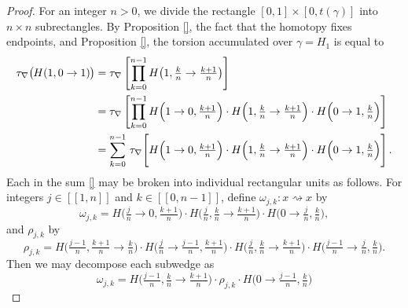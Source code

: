 \begin{proof}
  For an integer $n > 0$, we divide the rectangle $[0, 1] \times [0, t(\gamma)]$ into $n \times n$ subrectangles. By Proposition \ref{}, the fact that the homotopy fixes endpoints, and Proposition \ref{}, the torsion accumulated over $\gamma = H_1$ is equal to 
  \begin{align}
  \tau_\nabla \big(\hspace{-0.5pt}H(1, 0 \to 1)\hspace{-0.5pt}\big) 
  &= \tau_\nabla \left[\prod_{k = 0}^{n-1} H\big(1, \tfrac{k}{n} \to \tfrac{k + 1}{n}\big)\right] \\
  &= \tau_\nabla \left[\prod_{k = 0}^{n-1} H\Big(1 \to 0, \tfrac{k+1}{n}\Big) \cdot  H\Big(1, \tfrac{k}{n} \to \tfrac{k + 1}{n}\Big) \cdot H\Big(0 \to 1, \tfrac{k}{n}\Big)\right] \\
  &= \sum_{k=0}^{n- 1} \,\tau_\nabla \! \left[\vphantom{\prod^{n-1}}H\Big(1 \to 0, \tfrac{k+1}{n}\Big) \cdot  H\Big(1, \tfrac{k}{n} \to \tfrac{k + 1}{n}\Big) \cdot H\Big(0 \to 1, \tfrac{k}{n}\Big)\right].
  \end{align}
  Each  in the sum \ref{} may be broken into individual rectangular units as follows. For integers $j \in [\![1, n]\!]$ and $k \in [\![0, n - 1]\!]$, define  $ \omega_{j, k} \colon x \rightsquigarrow x$ by
  \begin{equation}
   \omega_{j, k} = H\Big(\tfrac{j}{n} \to 0, \tfrac{k+1}{n}\Big) \cdot  H\Big(\tfrac{j}{n}, \tfrac{k}{n} \to \tfrac{k + 1}{n}\Big) \cdot H\Big(0 \to \tfrac{j}{n}, \tfrac{k}{n}\Big),
  \end{equation}
  and  $\rho_{j,k}$ by 
  \begin{equation}
   \rho_{j, k} = H\Big(\tfrac{j-1}{n}, \tfrac{k+1}{n} \to \tfrac{k}{n}\Big) \cdot H\Big(\tfrac{j}{n} \to \tfrac{j-1}{n}, \tfrac{k+1}{n}\Big) \cdot  H\Big(\tfrac{j}{n}, \tfrac{k}{n} \to \tfrac{k + 1}{n}\Big) \cdot H\Big(\tfrac{j-1}{n} \to \tfrac{j}{n}, \tfrac{k}{n}\Big).
  \end{equation}
  Then we may decompose each subwedge as
  \begin{equation}
    \omega_{j, k} = H \Big(\tfrac{j-1}{n}, \tfrac{k}{n} \to \tfrac{k+1}{n}\Big) \cdot \rho_{j, k} \cdot H\Big(0 \to \tfrac{j-1}{n}, \tfrac{k}{n}\Big)
  \end{equation}
\end{proof}